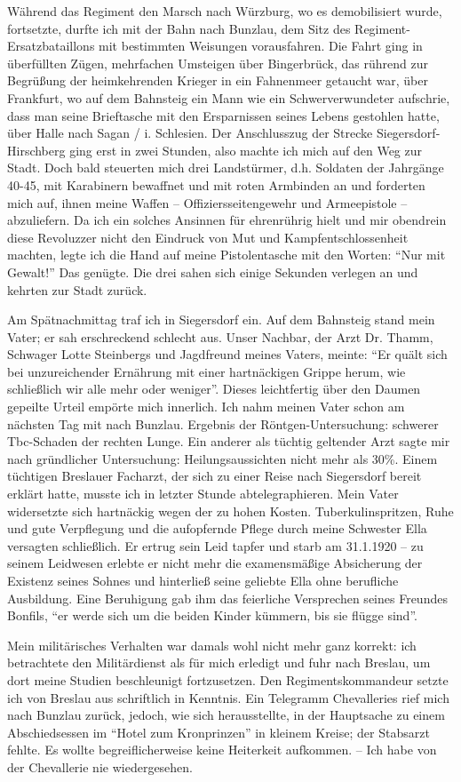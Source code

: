 Während das Regiment den Marsch nach Würzburg, wo es demobilisiert wurde, fortsetzte, durfte ich mit der Bahn nach Bunzlau, dem Sitz des Regi\-ment-Ersatzbataillons mit bestimmten Weisungen vorausfahren. Die Fahrt ging in überfüllten Zügen, mehrfachen Umsteigen über Bingerbrück, das rührend zur Begrüßung der heimkehrenden Krieger in ein Fahnenmeer getaucht war, über Frankfurt, wo auf dem Bahnsteig ein Mann wie ein Schwerverwundeter aufschrie, dass man seine Brieftasche mit den Ersparnissen seines Lebens gestohlen hatte, über Halle nach Sagan / i. Schlesien. Der Anschlusszug der Strecke Siegersdorf-Hirschberg ging erst in zwei Stunden, also machte ich mich auf den Weg zur Stadt. Doch bald steuerten mich drei Landstürmer, d.h. Soldaten der Jahrgänge 40-45, mit Karabinern bewaffnet und mit roten Armbinden an und forderten mich auf, ihnen meine Waffen -- Offiziersseitengewehr und Armeepistole -- abzuliefern. Da ich ein solches Ansinnen für ehrenrührig hielt und mir obendrein diese Revoluzzer nicht den Eindruck von Mut und Kampfentschlossenheit machten, legte ich die Hand auf meine Pistolentasche mit den Worten: \enquote{Nur mit Gewalt!} Das genügte. Die drei sahen sich einige Sekunden verlegen an und kehrten zur Stadt zurück.

Am Spätnachmittag traf ich in Siegersdorf ein. Auf dem Bahnsteig stand mein Vater; er sah erschreckend schlecht aus. Unser Nachbar, der Arzt Dr. Thamm, Schwager Lotte Steinbergs und Jagdfreund meines Vaters, meinte: \enquote{Er quält sich bei unzureichender Ernährung mit einer hartnäckigen Grippe herum, wie schließlich wir alle mehr oder weniger}. Dieses leichtfertig über den Daumen gepeilte Urteil empörte mich innerlich. Ich nahm meinen Vater schon am nächsten Tag mit nach Bunzlau. Ergebnis der Röntgen-Untersuchung: schwerer Tbc-Schaden der rechten Lunge. Ein anderer als tüchtig geltender Arzt sagte mir nach gründlicher Untersuchung: Heilungsaussichten nicht mehr als 30\%. Einem tüchtigen Breslauer Facharzt, der sich zu einer Reise nach Siegersdorf bereit erklärt hatte, musste ich in letzter Stunde abtelegraphieren. Mein Vater widersetzte sich hartnäckig wegen der zu hohen Kosten. Tuberkulinspritzen, Ruhe und gute Verpflegung und die aufopfernde Pflege durch meine Schwester Ella versagten schließlich. Er ertrug sein Leid tapfer und starb am 31.1.1920 -- zu seinem Leidwesen erlebte er nicht mehr die examensmäßige Absicherung der Existenz seines Sohnes und hinterließ seine geliebte Ella ohne berufliche Ausbildung. Eine Beruhigung gab ihm das feierliche Versprechen seines Freundes Bonfils, \enquote{er werde sich um die beiden Kinder kümmern, bis sie flügge sind}.

Mein militärisches Verhalten war damals wohl nicht mehr ganz korrekt: ich betrachtete den Militärdienst als für mich erledigt und fuhr nach Breslau, um dort meine Studien beschleunigt fortzusetzen. Den Regimentskommandeur setzte ich von Breslau aus schriftlich in Kenntnis. Ein Telegramm Chevalleries rief mich nach Bunzlau zurück, jedoch, wie sich herausstellte, in der Hauptsache zu einem Abschiedsessen im \enquote{Hotel zum Kronprinzen} in kleinem Kreise; der Stabsarzt fehlte. Es wollte begreiflicherweise keine Heiterkeit aufkommen. -- Ich habe von der Chevallerie nie wiedergesehen.


